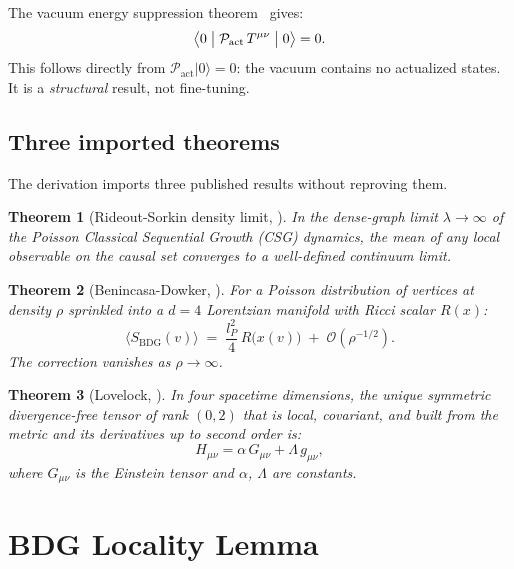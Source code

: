 \documentclass[11pt,a4paper]{article}
\newtheorem{theorem}{Theorem}[section]
\newcommand{\Pact}{\mathcal{P}_{\mathrm{act}}}
\newcommand{\SBDG}{S_{\mathrm{BDG}}}
\begin{document}
The vacuum energy suppression theorem~\citep{Sandeman2026RAGC} gives:
\begin{equation}
  \bigl\langle 0 \bigm| \Pact\, T^{\mu\nu} \bigm| 0 \bigr\rangle = 0.
  \label{eq:vacuum_suppression}
\end{equation}
This follows directly from $\Pact|0\rangle = 0$: the vacuum contains
no actualized states. It is a \emph{structural} result, not
fine-tuning.

\subsection{Three imported theorems}

The derivation imports three published results without reproving them.

\begin{theorem}[Rideout-Sorkin density limit, \citep{RideoutSorkin2000}]
\label{thm:rs}
In the dense-graph limit $\lambda \to \infty$ of the Poisson
Classical Sequential Growth (CSG) dynamics, the mean of any local
observable on the causal set converges to a well-defined continuum
limit.
\end{theorem}

\begin{theorem}[Benincasa-Dowker, \citep{Benincasa2010}]
\label{thm:bd}
For a Poisson distribution of vertices at density $\rho$ sprinkled
into a $d{=}4$ Lorentzian manifold with Ricci scalar $R(x)$:
\begin{equation}
  \bigl\langle \SBDG(v) \bigr\rangle
  \;=\; \frac{l_P^2}{4}\,R\bigl(x(v)\bigr)
        \;+\; \mathcal{O}(\rho^{-1/2}).
\end{equation}
The correction vanishes as $\rho \to \infty$.
\end{theorem}

\begin{theorem}[Lovelock, \citep{Lovelock1971}]
\label{thm:lovelock}
In four spacetime dimensions, the unique symmetric
divergence-free tensor of rank $(0,2)$ that is local, covariant,
and built from the metric and its derivatives up to second order is:
\begin{equation}
  H_{\mu\nu} = \alpha\, G_{\mu\nu} + \Lambda\, g_{\mu\nu},
\end{equation}
where $G_{\mu\nu}$ is the Einstein tensor and $\alpha$, $\Lambda$
are constants.
\end{theorem}

\section{BDG Locality Lemma}
\label{sec:locality}
\end{document}
